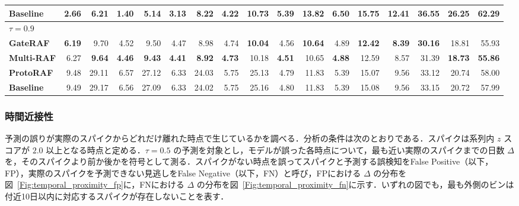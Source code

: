 \documentclass[twocolumn, lastpage]{jarticle}
\begin{document}
\begin{table}[t]
{\begin{tabular}{lrrrrrrrrrrrrrrrr}
            \quad \textbf{Baseline} & 2.66 & 6.21 & 1.40 & 5.14 & 3.13 & 8.22 & 4.22 & 10.73 & 5.39 & 13.82 & 6.50 & 15.75 & 12.41 & 36.55 & 26.25 & 62.29 \\
            \hline
            \multicolumn{17}{l}{$\tau=0.9$} \\
            \quad \textbf{GateRAF} & \textbf{6.19} & 9.70 & 4.52 & 9.50 & 4.47 & 8.98 & 4.74 & \textbf{10.04} & 4.56 & \textbf{10.64} & 4.89 & \textbf{12.42} & \textbf{8.39} & \textbf{30.16} & 18.81 & 55.93 \\
            \quad \textbf{Multi-RAF} & 6.27 & \textbf{9.64} & \textbf{4.46} & \textbf{9.43} & \textbf{4.41} & \textbf{8.92} & \textbf{4.73} & 10.18 & \textbf{4.51} & 10.65 & \textbf{4.88} & 12.59 & 8.57 & 31.39 & \textbf{18.73} & \textbf{55.86} \\
            \quad \textbf{ProtoRAF} & 9.48 & 29.11 & 6.57 & 27.12 & 6.33 & 24.03 & 5.75 & 25.13 & 4.79 & 11.83 & 5.39 & 15.07 & 9.56 & 33.12 & 20.74 & 58.00 \\
            \quad \textbf{Baseline} & 9.49 & 29.17 & 6.56 & 27.09 & 6.33 & 24.02 & 5.75 & 25.16 & 4.80 & 11.83 & 5.39 & 15.08 & 9.56 & 33.15 & 20.72 & 57.99 \\
            \hline
        \end{tabular}}
    \end{table}


\subsubsection{時間近接性}
予測の誤りが実際のスパイクからどれだけ離れた時点で生じているかを調べる．分析の条件は次のとおりである．スパイクは系列内 $z$ スコアが $2.0$ 以上となる時点と定める．$\tau=0.5$ の予測を対象とし，モデルが誤った各時点について，最も近い実際のスパイクまでの日数 $\Delta$ を，そのスパイクより前か後かを符号として測る．スパイクがない時点を誤ってスパイクと予測する誤検知をFalse Positive（以下，FP），実際のスパイクを予測できない見逃しをFalse Negative（以下，FN）と呼び，FPにおける $\Delta$ の分布を図~\ref{Fig:temporal_proximity_fp}に，FNにおける $\Delta$ の分布を図~\ref{Fig:temporal_proximity_fn}に示す．いずれの図でも，最も外側のビンは付近10日以内に対応するスパイクが存在しないことを表す．
\end{document}
